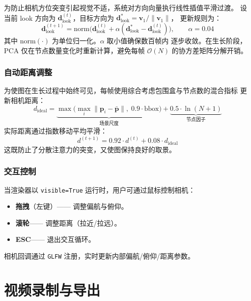 \documentclass[11pt,a4paper]{report}
\begin{document}
为防止相机方位突变引起视觉不适，系统对方向向量执行线性插值平滑过渡。
设当前 look 方向为 $\mathbf{d}_{\text{look}}^{(t)}$，目标方向为
$\mathbf{d}_{\text{look}}^{*} = \mathbf{v}_1 / \|\mathbf{v}_1\|$，
更新规则为：
\begin{equation}
    \mathbf{d}_{\text{look}}^{(t+1)} =
        \text{norm}\Big( \mathbf{d}_{\text{look}}^{(t)} +
        \alpha (\mathbf{d}_{\text{look}}^{*} - \mathbf{d}_{\text{look}}^{(t)})
        \Big), \qquad \alpha = 0.04
    \label{eq:pca-lerp}
\end{equation}
其中 $\text{norm}(\cdot)$ 为单位归一化。$\alpha$ 取小值确保数百帧内
逐步收敛。在生长阶段，PCA 仅在节点数量变化时重新计算，避免每帧
$\mathcal{O}(N)$ 的协方差矩阵分解开销。

\subsection{自动距离调整}
\label{sec:auto-dist}
为使图在生长过程中始终可见，每帧使用综合考虑包围盒与节点数的混合指标
更新相机距离：
\begin{equation}
    d_{\text{ideal}} = \underbrace{\max\Big(\max_i\|\mathbf{p}_i -
        \bar{\mathbf{p}}\|,\; 0.9 \cdot \text{bbox}\Big)}_{\text{场景尺度}}
        + \underbrace{0.5 \cdot \ln(N+1)}_{\text{节点因子}}
    \label{eq:cam-dist}
\end{equation}
实际距离通过指数移动平均平滑：
\begin{equation}
    d^{(t+1)} = 0.92 \cdot d^{(t)} + 0.08 \cdot d_{\text{ideal}}
    \label{eq:cam-smooth}
\end{equation}
这既防止了分散注意力的突变，又使图保持良好的取景。
\subsection{交互控制}
\label{sec:interactive}
当渲染器以 \lstinline{visible=True} 运行时，用户可通过鼠标控制相机：
\begin{itemize}
    \item \textbf{拖拽}（左键）—— 调整偏航与俯仰。
    \item \textbf{滚轮}—— 调整距离（拉近/拉远）。
    \item \textbf{ESC}—— 退出交互循环。
\end{itemize}
相机回调通过 \texttt{GLFW} 注册，实时更新内部偏航/俯仰/距离参数。
\chapter{视频录制与导出}
\label{ch:video}
\end{document}

